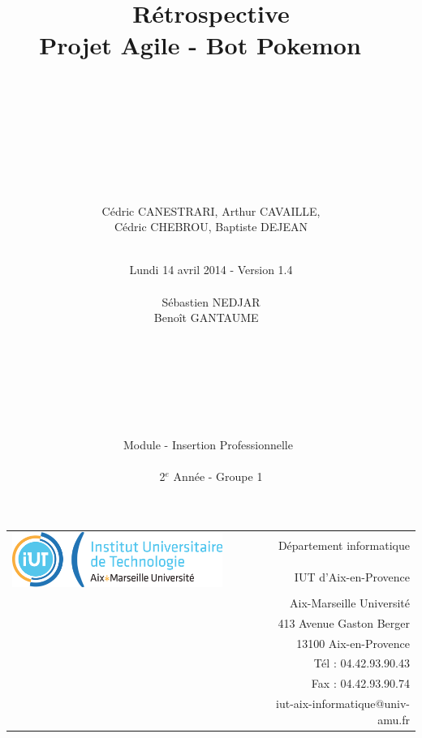 \documentclass[12pt]{article}
\begin{document}
\title{ ~\\~\\~\\Rétrospective\\\small{Projet Agile - Bot Pokemon} ~\\~\\~\\~\\~\\}

\author{Cédric CANESTRARI, Arthur CAVAILLE,\\ Cédric CHEBROU, Baptiste DEJEAN}
\date{~\\Lundi 14 avril 2014 - Version 1.4\\
	~\\
	Sébastien NEDJAR\\
	Benoît GANTAUME
	~\\~\\~\\~\\~\\~\\~\\
	~\\Module - Insertion Professionnelle~\\
	~\\2$^e$ Année - Groupe 1
	}
\footnotesize{
	\begin{tabular}{lp{2cm}r}
		  \multirow{2}{*}{\includegraphics[width=7cm]{LOGO-IUT-AMU.png}} && Département informatique \\
            && IUT d'Aix-en-Provence \\
            && Aix-Marseille Université \\
            && 413 Avenue Gaston Berger \\
            && 13100 Aix-en-Provence \\
            && Tél : 04.42.93.90.43 \\
            && Fax : 04.42.93.90.74 \\
            && iut-aix-informatique@univ-amu.fr 
    	\end{tabular}
}{\let\newpage\relax\maketitle} %
\newpage
{} %
\end{document}
